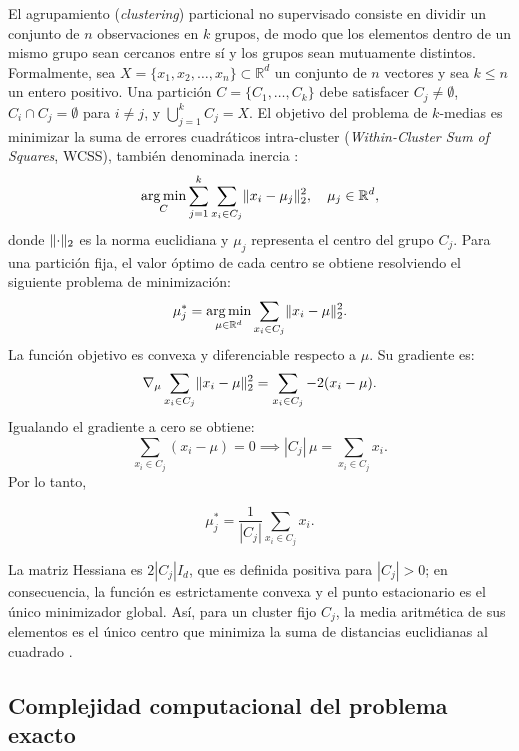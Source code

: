 \documentclass[11pt,letterpaper]{article}
\numberwithin{equation}{section}
\newcommand{\R}{\mathbb{R}}
\DeclarePairedDelimiter{\norm}{\lVert}{\rVert}
\DeclareMathOperator*{\argmin}{arg\,min}
\theoremstyle{plain}
\begin{document}
El agrupamiento (\textit{clustering}) particional no supervisado consiste en dividir un conjunto de $n$ observaciones en $k$ grupos, de modo que los elementos dentro de un mismo grupo sean cercanos entre sí y los grupos sean mutuamente distintos. Formalmente, sea $X = \{x_1, x_2, \dots, x_n\} \subset \R^d$ un conjunto de $n$ vectores y sea $k \le n$ un entero positivo. Una partición $C = \{C_1, \dots, C_k\}$ debe satisfacer $C_j \neq \emptyset$, $C_i \cap C_j = \emptyset$ para $i \neq j$, y $\bigcup_{j=1}^{k} C_j = X$. El objetivo del problema de $k$-medias es minimizar la suma de errores cuadráticos intra-cluster (\textit{Within-Cluster Sum of Squares}, WCSS), también denominada inercia \citep{cormen2022,lloyd1982}:
\begin{equation}\label{eq:wcss-def}
\argmin_{C} \sum_{j=1}^{k} \sum_{x_i \in C_j} \norm{x_i - \mu_j}_2^2, \quad \mu_j \in \R^d,
\end{equation}
donde $\norm{\cdot}_2$ es la norma euclidiana y $\mu_j$ representa el centro del grupo $C_j$. Para una partición fija, el valor óptimo de cada centro se obtiene resolviendo el siguiente problema de minimización:
\begin{equation}
\mu_j^* = \argmin_{\mu \in \R^d} \sum_{x_i \in C_j} \norm{x_i - \mu}_2^2.
\end{equation}
La función objetivo es convexa y diferenciable respecto a $\mu$. Su gradiente es:
\begin{equation}
\nabla_{\mu} \sum_{x_i \in C_j} \norm{x_i - \mu}_2^2 = \sum_{x_i \in C_j} -2(x_i - \mu).
\end{equation}
Igualando el gradiente a cero se obtiene:
\begin{equation}
\sum_{x_i \in C_j} (x_i - \mu) = 0 \implies |C_j|\,\mu = \sum_{x_i \in C_j} x_i.
\end{equation}
Por lo tanto,
\begin{resultado}
\begin{equation}\label{eq:centroide}
\mu_j^* = \frac{1}{|C_j|} \sum_{x_i \in C_j} x_i.
\end{equation}
\end{resultado}
La matriz Hessiana es $2|C_j|I_d$, que es definida positiva para $|C_j| > 0$; en consecuencia, la función es estrictamente convexa y el punto estacionario es el único minimizador global. Así, para un cluster fijo $C_j$, la media aritmética de sus elementos es el único centro que minimiza la suma de distancias euclidianas al cuadrado \citep{lloyd1982,cormen2022}.

\subsection{Complejidad computacional del problema exacto}
\end{document}
